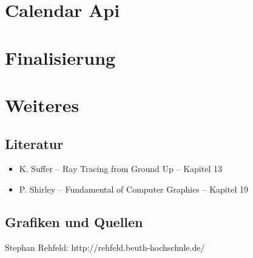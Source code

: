 \documentclass[12pt,titlepage]{article}
\begin{document}
\newpage
\section{Calendar Api}

\newpage
\section{Finalisierung}

\newpage

\section{Weiteres}
\subsection{Literatur}
\begin{itemize}
\item K. Suffer – Ray Tracing from Ground Up – Kapitel 13
\item P. Shirley – Fundamental of Computer Graphics – Kapitel 19
\end{itemize}
\subsection{Grafiken und Quellen}
Stephan Rehfeld: http://rehfeld.beuth-hochschule.de/

 
   
\end{document}
